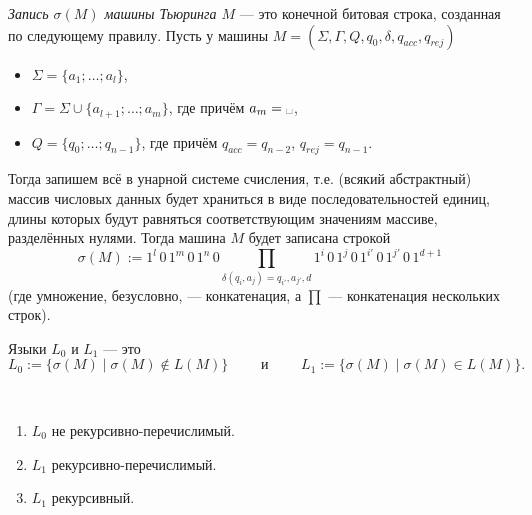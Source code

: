 \documentclass[12pt,a4paper]{article}
\newcommand{\spacesymbol}{\ensuremath{\text{\textvisiblespace}}}
\begin{document}
    \begin{definition}
        \emph{Запись $\sigma(M)$ машины Тьюринга $M$} --- это конечной битовая строка, созданная по следующему правилу. Пусть у машины $M = (\Sigma, \Gamma, Q, q_0, \delta, q_{acc}, q_{rej})$
        \begin{itemize}
            \item $\Sigma = \{a_1; \dots; a_l\}$,
            \item $\Gamma = \Sigma \cup \{a_{l+1}; \dots; a_m\}$, где причём $a_m = \spacesymbol$,
            \item $Q = \{q_0; \dots; q_{n-1}\}$, где причём $q_{acc} = q_{n-2}$, $q_{rej} = q_{n-1}$.
        \end{itemize}
        Тогда запишем всё в унарной системе счисления, т.е. (всякий абстрактный) массив числовых данных будет храниться в виде последовательностей единиц, длины которых будут равняться соответствующим значениям массиве, разделённых нулями. Тогда машина $M$ будет записана строкой
        \[\sigma(M) := 1^l\, 0\, 1^m\, 0\, 1^n\, 0 \prod_{\delta(q_i, a_j) = q_{i'}, a_{j'}, d} 1^i\, 0\, 1^j\, 0\, 1^{i'}\, 0\, 1^{j'}\, 0\, 1^{d+1}\]
        (где умножение, безусловно, --- конкатенация, а $\prod$ --- конкатенация нескольких строк).
    \end{definition}

    \begin{definition}
        Языки $L_0$ и $L_1$ --- это
        \[
            L_0 := \{\sigma(M) \mid \sigma(M) \notin L(M)\}
            \qquad \text{ и } \qquad
            L_1 := \{\sigma(M) \mid \sigma(M) \in L(M)\}.
        \]
    \end{definition}

    \begin{theorem}\ 
        \begin{enumerate}
            \item $L_0$ не рекурсивно-перечислимый.
            \item $L_1$ рекурсивно-перечислимый.
            \item $L_1$ рекурсивный.
        \end{enumerate}
    \end{theorem}
\end{document}
